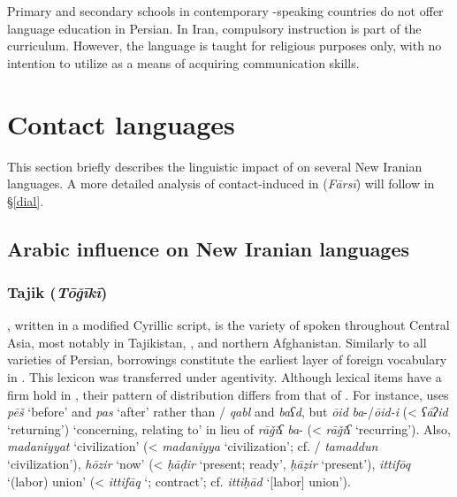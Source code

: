 \documentclass[output=paper]{langsci/langscibook}
\begin{document}
Primary and secondary schools in contemporary -speaking countries do not offer language education in Persian. In Iran, compulsory   instruction is part of the curriculum. However, the language is taught for religious purposes only, with no intention to utilize  as a means of acquiring communication skills.

\section{Contact languages}

This section briefly describes the linguistic impact of   on several New Iranian languages. A more detailed analysis of contact-induced  in  (\textit{Fārsī}) will follow in §\ref{dial}.

\subsection{Arabic influence on New Iranian languages}

\subsubsection{Tajik (\textit{Tōǧīkī})}

, written in a modified Cyrillic script, is the variety of  spoken throughout Central Asia, most notably in Tajikistan, , and northern Afghanistan. Similarly to all varieties of Persian,  borrowings constitute the earliest layer of foreign vocabulary in  \citep{Perry2009}. This lexicon was transferred under  agentivity. Although  lexical items have a firm hold in , their pattern of distribution differs from that of . For instance,  uses \textit{pēš} ‘before’ and \textit{pas} ‘after’ rather than / \textit{qabl} and \textit{baʕd}, but \textit{ōid} \textit{ba}{}-/\textit{ōid-i} (<  \textit{ʕāʔid} ‘returning’) ‘concerning, relating to’ in lieu of  \textit{rāǧiʕ} \textit{ba}{}- (<  \textit{rāǧiʕ} ‘recurring’). Also, \textit{madaniyyat} ‘civilization’ (<  \textit{madaniyya} ‘civilization’; cf. / \textit{tamaddun} ‘civilization’), \textit{hōzir} ‘now’ (<  \textit{ḥāḍir} ‘present; ready’,  \textit{ḥāẓir} ‘present’), \textit{ittifōq} ‘(labor) union’ (<  \textit{ittifāq} ‘; contract’; cf.   \textit{ittiḥād} ‘[labor] union’).
\end{document}
